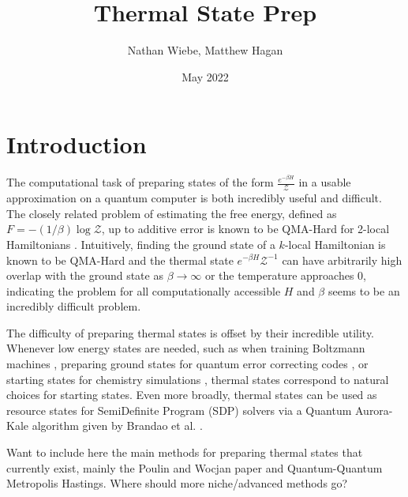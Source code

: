 \documentclass{article}
\title{Thermal State Prep}
\author{Nathan Wiebe, Matthew Hagan}
\date{May 2022}
\newcommand{\partfun}{\mathcal{Z}}
\begin{document}
\maketitle

\section{Introduction}
The computational task of preparing states of the form $\frac{e^{-\beta H}}{\partfun}$ in a usable approximation on a quantum computer is both incredibly useful and difficult. The closely related problem of estimating the free energy, defined as $F = -(1/\beta) \log \partfun$, up to additive error is known to be QMA-Hard for 2-local Hamiltonians \cite{bravyi_complexity_2021}. Intuitively, finding the ground state of a $k$-local Hamiltonian is known to be QMA-Hard \cite{} and the thermal state $e^{-\beta H} \partfun^{-1}$ can have arbitrarily high overlap with the ground state as $\beta \to \infty$ or the temperature approaches 0, indicating the problem for all computationally accessible $H$ and $\beta$ seems to be an incredibly difficult problem. 

The difficulty of preparing thermal states is offset by their incredible utility. Whenever low energy states are needed, such as when training Boltzmann machines \cite{}, preparing ground states for quantum error correcting codes \cite{}, or starting states for chemistry simulations \cite{}, thermal states correspond to natural choices for starting states. Even more broadly, thermal states can be used as resource states for SemiDefinite Program (SDP) solvers via a Quantum Aurora-Kale algorithm given by Brandao et al. \cite{}. 

Want to include here the main methods for preparing thermal states that currently exist, mainly the Poulin and Wocjan paper and Quantum-Quantum Metropolis Hastings. Where should more niche/advanced methods go?

\end{document}
